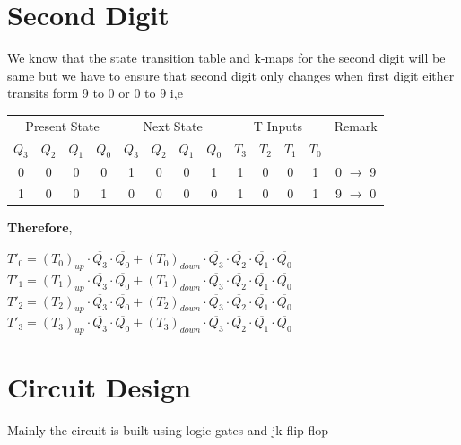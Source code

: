 \documentclass{article}
\begin{document}
    \section*{\textbf{Second Digit}}
    We know that the state transition table and k-maps for the second digit will be same but we have to ensure that second digit only changes when first digit either transits form 9 to 0 or 0 to 9
    i,e
    \begin{center}
     \begin{tabular}{cccc|cccc|cccc|c}
    \toprule
    \multicolumn{4}{c|}{Present State} & \multicolumn{4}{c|}{Next State} & \multicolumn{4}{c|}{T Inputs} & Remark \\
    $Q_3$ & $Q_2$ & $Q_1$ & $Q_0$ & $Q_3$ & $Q_2$ & $Q_1$ & $Q_0$ & $T_3$ & $T_2$ & $T_1$ & $T_0$ & \\
    \midrule
    0 & 0 & 0 & 0 & 1 & 0 & 0 & 1 & 1 & 0 & 0 & 1 & 0 $\rightarrow$ 9 \\
    1 & 0 & 0 & 1 & 0 & 0 & 0 & 0 & 1 & 0 & 0 & 1 & 9 $\rightarrow$ 0 \\
    
    \bottomrule
    \end{tabular}   
    \end{center}
    \textbf{Therefore},\\
    \begin{center}
        $T'_0=(T_0)_{up} \cdot \overline{Q_3} \cdot \overline{Q_0} + (T_0)_{down} \cdot \overline{Q_3} \cdot \overline{Q_2} \cdot \overline{Q_1} \cdot \overline{Q_0}$\\
        $T'_1=(T_1)_{up} \cdot \overline{Q_3} \cdot \overline{Q_0} + (T_1)_{down} \cdot \overline{Q_3} \cdot \overline{Q_2} \cdot \overline{Q_1} \cdot \overline{Q_0}$\\
        $T'_2=(T_2)_{up} \cdot \overline{Q_3} \cdot \overline{Q_0} + (T_2)_{down} \cdot \overline{Q_3} \cdot \overline{Q_2} \cdot \overline{Q_1} \cdot \overline{Q_0}$\\
        $T'_3=(T_3)_{up} \cdot \overline{Q_3} \cdot \overline{Q_0} + (T_3)_{down} \cdot \overline{Q_3} \cdot \overline{Q_2} \cdot \overline{Q_1} \cdot \overline{Q_0}$\\
    \end{center}
    
    \section{Circuit Design}
    Mainly the circuit is built using logic gates and jk flip-flop
\end{document}
